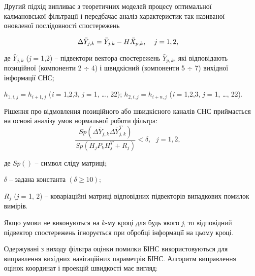 Другий підхід випливає з теоретичних моделей процесу оптимальної калмановської фільтрації 
і передбачає аналіз характеристик так називаної оновленої послідовності спостережень

\begin{equation} 
\label{eq:y_calc} 
\Delta \bar{Y}_{j,k} =\bar{Y}_{j,k} -H\bar{X}_{p,k} ,{\rm \; \; \; \; }j={\rm 1,2,} \end{equation} 

де  $\bar{Y}_{j,k} $ (\textit{j} = 1,2) -- підвектори вектора спостережень $\bar{Y}_{p,k} $, 
які відповідають позиційної (компоненти 2 $\div $ 4) і швидкісний (компоненти  5 $\div $ 7) 
вихідної інформації СНС;

$h_{1,i,j} =h_{i+1,j} $  (\textit{i} = 1,2,3,  \textit{j} = 1, \dots , 22);
$h_{2,i,j} =h_{i+n,j} $ (\textit{i} = 1,2,3, \textit{j} = 1, \dots , 22).

Рішення про відмовлення позиційного або швидкісного каналів СНС приймається на основі 
аналізу умов нормальної роботи фільтра:
\begin{equation} 
\label{eq:y_sns_otkaz}
\frac{Sp(\Delta \bar{Y}_{j,k} \Delta \bar{Y}_{j,k} ^{T} )}{Sp(H_{j} P_{k} H_{j}^{T} +R_{j} )} <\delta ,\, \, \, \, j=1,2,    
\end{equation} 
\begin{ESKDexplanation}
\item де $Sp()$ -- символ сліду матриці;
\item $\delta $ -- задана константа $(\delta \ge 10);$
\item $R_{j} $ (\textit{j} = 1, 2) -- коваріаційні матриці відповідних підвекторів випадкових помилок вимірів.
\end{ESKDexplanation}
Якщо умови не виконуються на $k$-му  кроці для будь якого \textit{j}, то відповідний 
підвектор спостережень ігнорується при обробці інформації на цьому кроці.

Одержувані з виходу фільтра оцінки помилки БІНС використовуються для виправлення вихідних навігаційних параметрів БІНС. Алгоритм виправлення оцінок координат і проекцій швидкості має вигляд:

